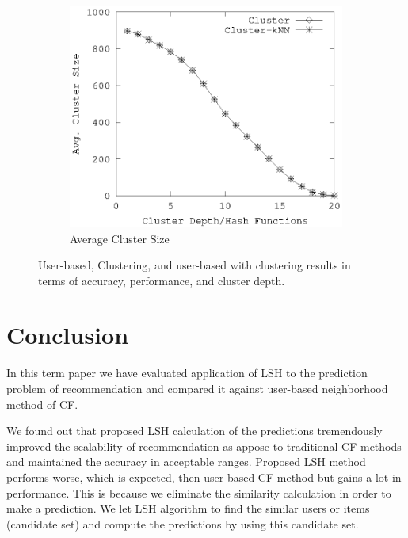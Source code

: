 \documentclass[conference]{IEEEtran}
\begin{document}
\begin{figure}[!h]
\begin{subfigure}[b]{0.225\textwidth}
        \end{subfigure} 
        \\
         \begin{subfigure}[b]{0.225\textwidth}
                \includegraphics[width=\textwidth]{charts/cl-size.eps}
                \caption{Average Cluster Size}
                \label{fig:lsh-functions-candidate-size}
        \end{subfigure} 
        \caption{User-based, Clustering, and user-based with clustering results in terms of accuracy, performance, and cluster depth.}
        \label{fig:custering}
\end{figure}


\section{Conclusion}

In this term paper we have evaluated application of LSH to the prediction 
problem of recommendation and compared it against user-based neighborhood 
method of CF. 

We found out that proposed LSH calculation of the predictions tremendously 
improved the scalability of recommendation as appose to traditional CF methods 
and maintained the accuracy in acceptable ranges. Proposed LSH method performs 
worse, which is expected, then user-based CF method but gains a lot in performance.
This is because we eliminate the similarity calculation in order to make a prediction. 
We let LSH algorithm to find the similar users or items (candidate set) and compute 
the predictions by using this candidate set.
\end{document}
